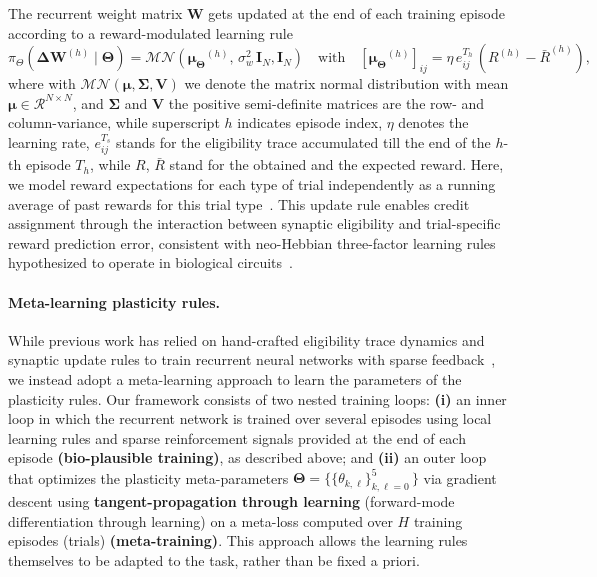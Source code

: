 \documentclass[mlabstract]{jmlr}
\begin{document}
The recurrent weight matrix $\mathbf{W}$ gets updated at the end of each training episode according to a reward-modulated learning rule
\begin{equation} \label{eq:update_rule}
\pi_{\Theta}\left(  \mathbf{\Delta W}^{(h)} \mid \boldsymbol{\Theta} \right) = \mathcal{MN}\left( \boldsymbol{\mu_{\Theta}}^{(h)},\, \sigma^2_w \, \mathbf{I}_N, \mathbf{I}_N \right) \quad \text{with}\quad  [\boldsymbol{\mu_{\Theta}}^{(h)}]_{ij} = \eta \, e^{T_h}_{ij}\, \left( {R}^{(h)} - \bar{R}^{(h)}\right) ,
\end{equation}
where with $\mathcal{MN}\left(\boldsymbol{\mu}, \boldsymbol{\Sigma}, \mathbf{V}\right)$ we denote the matrix normal distribution with mean $\boldsymbol{\mu} \in \mathcal{R}^{N\times N}$, and $\boldsymbol{\Sigma}$ and $\mathbf{V}$ the positive semi-definite matrices are the row- and column-variance, while superscript $h$ indicates episode index,
$\eta$ denotes the learning rate,
$e^{T_s}_{ij}$ stands for the eligibility trace accumulated till the end of the $h$-th episode $T_h$, while $R$, $\bar{R}$ stand for the obtained and the expected reward. Here, we model reward expectations for each type of trial independently as a running average of past rewards for this trial type~\citep{miconi2017biologically}. This update rule enables credit assignment through the interaction between synaptic eligibility and trial-specific reward prediction error, consistent with neo-Hebbian three-factor learning rules hypothesized to operate in biological circuits~\citep{gerstner2018eligibility}. 

\paragraph{Meta-learning plasticity rules.} While previous work has relied on hand-crafted eligibility trace dynamics and synaptic update rules to train recurrent neural networks with sparse feedback~\citep{miconi2017biologically}, we instead adopt a meta-learning approach to learn the parameters of the plasticity rules.
Our framework consists of two nested training loops:
\textcolor{mymaroon}{\textbf{(i)}} an inner loop in which the recurrent network is trained over several episodes using local learning rules and sparse reinforcement signals provided at the end of each episode \textcolor{carmine}{\textbf{(bio-plausible training)}}, as described above; and
\textcolor{cadmiumorange}{\textbf{(ii)}} an outer loop that optimizes the plasticity meta-parameters $\boldsymbol{\Theta} = \{ \{\theta_{k,\ell}\}^5_{k,\ell=0}\, \}$ via gradient descent using \textbf{tangent-propagation through learning} (forward-mode differentiation through learning) on a meta-loss computed over $H$ training episodes (trials) \textcolor{cadmiumorange}{\textbf{(meta-training)}}.
This approach allows the learning rules themselves to be adapted to the task, rather than be fixed a priori.
\end{document}
